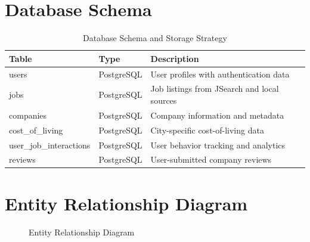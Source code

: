 \section{Database Schema}

\begin{table}[H]
\centering
\caption{Database Schema and Storage Strategy}
\label{tab:schema}
\begin{tabular}{|l|l|p{6cm}|}
\hline
\textbf{Table} & \textbf{Type} & \textbf{Description} \\
\hline
users & PostgreSQL & User profiles with authentication data \\
\hline
jobs & PostgreSQL & Job listings from JSearch and local sources \\
\hline
companies & PostgreSQL & Company information and metadata \\
\hline
cost\_of\_living & PostgreSQL & City-specific cost-of-living data \\
\hline
user\_job\_interactions & PostgreSQL & User behavior tracking and analytics \\
\hline
reviews & PostgreSQL & User-submitted company reviews \\
\hline
\end{tabular}
\end{table}

\section{Entity Relationship Diagram}

\begin{figure}[H]
\centering
{}
\caption{Entity Relationship Diagram}
\label{fig:erd}
\end{figure}
